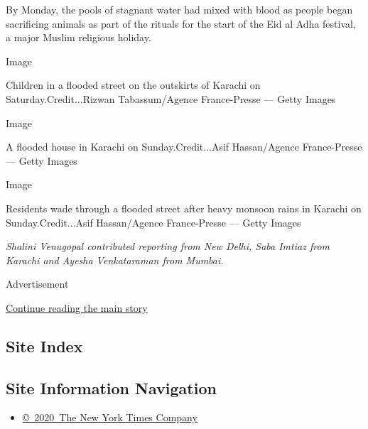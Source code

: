 By Monday, the pools of stagnant water had mixed with blood as people
began sacrificing animals as part of the rituals for the start of the
Eid al Adha festival, a major Muslim religious holiday.

Image

Children in a flooded street on the outskirts of Karachi on
Saturday.Credit...Rizwan Tabassum/Agence France-Presse --- Getty Images

Image

A flooded house in Karachi on Sunday.Credit...Asif Hassan/Agence
France-Presse --- Getty Images

Image

Residents wade through a flooded street after heavy monsoon rains in
Karachi on Sunday.Credit...Asif Hassan/Agence France-Presse --- Getty
Images

\emph{Shalini Venugopal contributed reporting from New Delhi, Saba
Imtiaz from Karachi and Ayesha Venkataraman from Mumbai.}

Advertisement

\protect\hyperlink{after-bottom}{Continue reading the main story}

\hypertarget{site-index}{%
\subsection{Site Index}\label{site-index}}

\hypertarget{site-information-navigation}{%
\subsection{Site Information
Navigation}\label{site-information-navigation}}

\begin{itemize}
\tightlist
\item
  \href{https://help.nytimes.com/hc/en-us/articles/115014792127-Copyright-notice}{©~2020~The
  New York Times Company}
\end{itemize}

